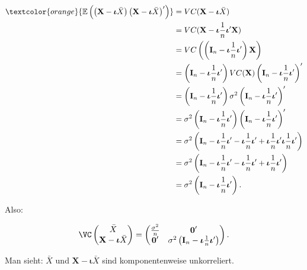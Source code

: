 \documentclass{tstextbook}
\begin{document}
\begin{example}
\begin{align*}
	\textcolor{orange}{\mathbb{E}\left(\left(\textbf{X}-\boldsymbol{\iota}\bar{X}\right)\left(\textbf{X}-\boldsymbol{\iota}\bar{X}\right)^{\prime}\right)} & =VC(\textbf{X}-\boldsymbol{\iota}\bar{X})\\
	& =VC(\textbf{X}-\boldsymbol{\iota}\frac{1}{n}\boldsymbol{\iota}^{\prime}\textbf{X})\\
	& =VC\left(\left(\textbf{I}_{n}-\boldsymbol{\iota}\frac{1}{n}\boldsymbol{\iota}^{\prime}\right)\textbf{X}\right)\\
	& =\left(\textbf{I}_{n}-\boldsymbol{\iota}\frac{1}{n}\boldsymbol{\iota}^{\prime}\right)VC(\textbf{X})\left(\textbf{I}_{n}-\boldsymbol{\iota}\frac{1}{n}\boldsymbol{\iota}^{\prime}\right)^{\prime}\\
	& =\left(\textbf{I}_{n}-\boldsymbol{\iota}\frac{1}{n}\boldsymbol{\iota}^{\prime}\right)\sigma^{2}\left(\textbf{I}_{n}-\boldsymbol{\iota}\frac{1}{n}\boldsymbol{\iota}^{\prime}\right)^{\prime}\\
	& =\sigma^{2}\left(\textbf{I}_{n}-\boldsymbol{\iota}\frac{1}{n}\boldsymbol{\iota}^{\prime}\right)\left(\textbf{I}_{n}-\boldsymbol{\iota}\frac{1}{n}\boldsymbol{\iota}^{\prime}\right)^{\prime}\\
	& =\sigma^{2}\left(\textbf{I}_{n}-\boldsymbol{\iota}\frac{1}{n}\boldsymbol{\iota}^{\prime}-\boldsymbol{\iota}\frac{1}{n}\boldsymbol{\iota}^{\prime}+\boldsymbol{\iota}\frac{1}{n}\boldsymbol{\iota}^{\prime}\boldsymbol{\iota}\frac{1}{n}\boldsymbol{\iota}^{\prime}\right)\\
	& =\sigma^{2}\left(\textbf{I}_{n}-\boldsymbol{\iota}\frac{1}{n}\boldsymbol{\iota}^{\prime}-\boldsymbol{\iota}\frac{1}{n}\boldsymbol{\iota}^{\prime}+\boldsymbol{\iota}\frac{1}{n}\boldsymbol{\iota}^{\prime}\right)\\
	& =\sigma^{2}\left(\textbf{I}_{n}-\boldsymbol{\iota}\frac{1}{n}\boldsymbol{\iota}^{\prime}\right).
\end{align*}


Also:

\[
\VC\begin{pmatrix}
	\bar{X} \\ \textbf{X}-\boldsymbol{\iota}\bar{X}
\end{pmatrix}=\begin{pmatrix}\frac{\sigma^{2}}{n} & \boldsymbol{0}^{\prime}\\
	\boldsymbol{0}^{\prime} & \sigma^{2}\left(\textbf{I}_{n}-\boldsymbol{\iota}\frac{1}{n}\boldsymbol{\iota}^{\prime}\right)
\end{pmatrix}.
\]

Man sieht: $ \bar{X} $ und $ \textbf{X}-\boldsymbol{\iota}\bar{X} $ sind komponentenweise unkorreliert.

\end{example}
\end{document}
